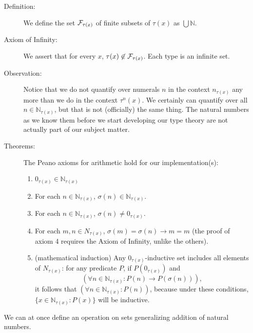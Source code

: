 \documentclass[12pt]{article}
\begin{document}
\begin{description}
\item[Definition:]  We define the set ${\cal F}_{\tau(x)}$ of finite subsets of $\tau(x)$ as $\bigcup \mathbb N$.

\item[Axiom of Infinity:]  We assert that for every $x$, $\tau(x) \not\in {\cal F}_{\tau(x)}$.  Each type is an infinite set.

\item[Observation:]  Notice that we do not quantify over numerals $n$ in the context $n_{\tau(x)}$ any more than we do in the context $\tau^n(x)$.  We certainly can quantify over all $n \in \mathbb N_{\tau(x)}$, but that is not (officially) the same thing.  The natural numbers as we know them before we start developing our type theory are not actually part of our subject matter.

\item[Theorems:]  The Peano axioms for arithmetic hold for our implementation(s):

\begin{enumerate}

\item $0_{\tau(x)} \in {\mathbb N}_{\tau(x)}$

\item For each $n \in \mathbb N_{\tau(x)}$, $\sigma(n) \in \mathbb N_{\tau(x)}$.

\item For each $n \in \mathbb N_{\tau(x)}$, $\sigma(n) \neq 0_{\tau(x)}$.

\item For each $m,n \in N_{\tau(x)}$,  $\sigma(m)=\sigma(n) \rightarrow m=m$ (the proof of axiom 4 requires the Axiom of Infinity, unlike the others).

\item (mathematical induction)  Any $0_{\tau(x)}$-inductive set includes all elements of $N_{\tau(x)}$:  for any predicate $P$, if $P(0_{\tau(x)})$ and $$(\forall n \in \mathbb N_{\tau(x)}:P(n) \rightarrow P(\sigma(n))),$$ it follows that $(\forall n \in \mathbb N_{\tau(x)}:P(n))$, because under these conditions, $\{x \in \mathbb N_{\tau(x)}:P(x)\}$ will be inductive.

\end{enumerate}

\end{description}

We can at once define an operation on sets generalizing addition of natural numbers.
\end{document}
